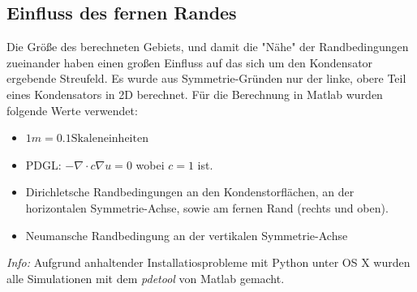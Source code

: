 \subsection{Einfluss des fernen Randes}

Die Größe des berechneten Gebiets, und damit die "Nähe" der Randbedingungen zueinander haben einen großen Einfluss auf das sich um den Kondensator ergebende Streufeld. Es wurde aus Symmetrie-Gründen nur der linke, obere Teil eines Kondensators in 2D berechnet.
Für die Berechnung in Matlab wurden folgende Werte verwendet: 
\begin{itemize}
	\item $1m = 0.1 \text{Skaleneinheiten}$
	\item PDGL: $ - \nabla \cdot c \nabla u = 0$ wobei $c=1$ ist.
	\item Dirichletsche Randbedingungen an den Kondenstorflächen, an der horizontalen Symmetrie-Achse, sowie am fernen Rand (rechts und oben).
	\item Neumansche Randbedingung an der vertikalen Symmetrie-Achse
\end{itemize}
\textit{Info:} Aufgrund anhaltender Installatiosprobleme mit Python unter OS X wurden alle Simulationen mit dem \textit{pdetool} von Matlab gemacht. 

